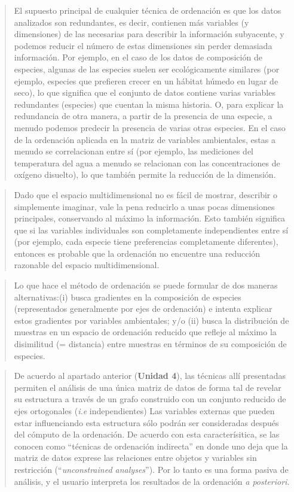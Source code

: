 \documentclass[
]{book}
\begin{document}
\begin{quote}
El supuesto principal de cualquier técnica de ordenación es que los datos analizados son redundantes, es decir, contienen más variables (y dimensiones) de las necesarias para describir la información subyacente, y podemos reducir el número de estas dimensiones sin perder demasiada información. Por ejemplo, en el caso de los datos de composición de especies, algunas de las especies suelen ser ecológicamente similares (por ejemplo, especies que prefieren crecer en un hábitat húmedo en lugar de seco), lo que significa que el conjunto de datos contiene varias variables redundantes (especies) que cuentan la misma historia. O, para explicar la redundancia de otra manera, a partir de la presencia de una especie, a menudo podemos predecir la presencia de varias otras especies. En el caso de la ordenación aplicada en la matriz de variables ambientales, estas a menudo se correlacionan entre sí (por ejemplo, las mediciones del temperatura del agua a menudo se relacionan con las concentraciones de oxígeno disuelto), lo que también permite la reducción de la dimensión.
\end{quote}

\begin{quote}
Dado que el espacio multidimensional no es fácil de mostrar, describir o simplemente imaginar, vale la pena reducirlo a unas pocas dimensiones principales, conservando al máximo la información. Esto también significa que si las variables individuales son completamente independientes entre sí (por ejemplo, cada especie tiene preferencias completamente diferentes), entonces es probable que la ordenación no encuentre una reducción razonable del espacio multidimensional.
\end{quote}

\begin{quote}
Lo que hace el método de ordenación se puede formular de dos maneras alternativas:(i) busca gradientes en la composición de especies (representados generalmente por ejes de ordenación) e intenta explicar estos gradientes por variables ambientales; y/o (ii) busca la distribución de muestras en un espacio de ordenación reducido que refleje al máximo la disimilitud (= distancia) entre muestras en términos de su composición de especies.
\end{quote}

\begin{quote}
De acuerdo al apartado anterior (\textbf{Unidad 4}), las técnicas allí presentadas permiten el análisis de una única matriz de datos de forma tal de revelar su estructura a través de un grafo construido con un conjunto reducido de ejes ortogonales (\emph{i.e} independientes) Las variables externas que pueden estar influenciando esta estructura sólo podrán ser consideradas después del cómputo de la ordenación. De acuerdo con esta caracterísitica, se las conocen como ``técnicas de ordenación indirecta'' en donde uno deja que la matriz de datos exprese las relaciones entre objetos y variables sin restricción (``\emph{unconstrained analyses}''). Por lo tanto es una forma pasiva de análisis, y el usuario interpreta los resultados de la ordenación \emph{a posteriori}.
\end{quote}
\end{document}
